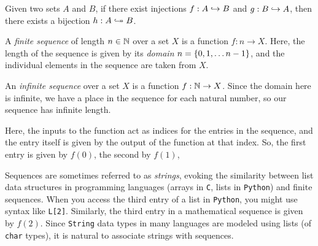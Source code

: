 \begin{theorem}
    Given two sets $A$ and $B$,
    if there exist injections $f: A \hookrightarrow B$ and $g: B \hookrightarrow A$,
    then there exists a bijection $h: A \bijection B$.
\end{theorem}

\begin{definition}[Sequences]
    A \emph{finite sequence} of length $n \in \mathbb{N}$ over a set $X$ is a function $f: n \to X$.
    Here, the length of the sequence is given by its \emph{domain} $n = \set*{0, 1, \dots n - 1}$,
    and the individual elements in the sequence are taken from $X$.

    An \emph{infinite sequence} over a set $X$ is a function $f: \mathbb{N} \to X$.
    Since the domain here is infinite, we have a place in the sequence for each natural number,
    so our sequence has infinite length.

    Here, the inputs to the function act as indices for the entries in the sequence,
    and the entry itself is given by the output of the function at that index.
    So, the first entry is given by $f(0)$, the second by $f(1)$, \etc

    Sequences are sometimes referred to as \emph{strings},
    evoking the similarity between list data structures in programming languages
    (\eg arrays in \texttt{C}, lists in \texttt{Python})
    and finite sequences.
    When you access the third entry of a list in \texttt{Python},
    you might use syntax like \texttt{L[2]}.
    Similarly, the third entry in a mathematical sequence is given by $f(2)$.
    Since \texttt{String} data types in many languages are modeled using lists (\eg of \texttt{char} types),
    it is natural to associate strings with sequences.
\end{definition}


